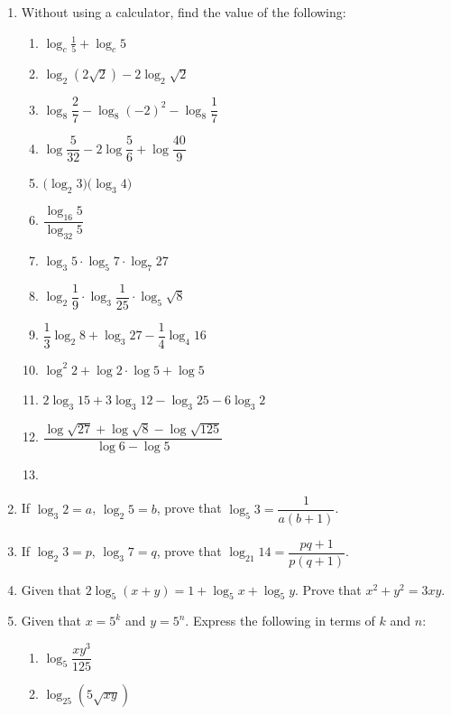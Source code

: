 \documentclass[12pt]{report}
\begin{document}
\begin{multicols}{2}
\begin{enumerate}
    \item Without using a calculator, find the value of the following:
          \begin{enumerate}
            \item $\log_{c}{\frac{1}{5}}+\log_{c}5$
            \item $\log_{2}\left(2{\sqrt{2}}\right)-2\log_{2}{\sqrt{2}}$
            \item $\log_8{\dfrac{2}{7}}-\log_{8}{(-2)}^{2}-\log_{8}{\dfrac{1}{7}}$
            \item $\log{\dfrac{5}{32}}-2\log{\dfrac{5}{6}}+\log{\dfrac{40}{9}}$
            \item ${\big(}\log_{2}3{\big)}{\big(}\log_{3}4{\big)}$
            \item $\dfrac{\log_{16}5}{\log_{32}5}$
            \item $\log_{3}5\cdot\log_{5}7\cdot\log_{7}27$
            \item $\log_{2}{\dfrac{1}{9}}\cdot\log_{3}{\dfrac{1}{25}}\cdot\log_{5}\sqrt8$
            \item $\dfrac{1}{3}\log_{2}8+\log_{3}27-\dfrac{1}{4}\log_{4}16$
            \item $\log^{2}2+\log2\cdot\log5+\log5$
            \item $2\log_{3}15+3\log_{3}12-\log_{3}25-6\log_{3}2$
            \item ${\dfrac{\log{\sqrt{27}}+\log{\sqrt{8}}-\log{\sqrt{125}}}{\log6-\log5}}$
            \item {}
          \end{enumerate}

    \item If $\log_3 2 = a$, $\log_2 5 = b$, prove that $\log_5 3 = \dfrac{1}{a(b+1)}$.
    \item If $\log_2 3 = p$, $\log_3 7 = q$, prove that $\log_21 14 =
            \dfrac{pq+1}{p(q+1)}$.
    \item Given that $2\log_5(x+y) = 1 + \log_5 x + \log_5 y$. Prove that $x^2 + y^2 =
            3xy$.
    \item Given that $x = 5^k$ and $y = 5^n$. Express the following in terms of $k$ and
          $n$:
          \begin{enumerate}
            \item $\log_{5}{\dfrac{xy^3}{125}}$
            \item $\log_{25}\left(5{\sqrt{xy}}\right)$
          \end{enumerate}


\end{enumerate}
\end{multicols}
\end{document}
